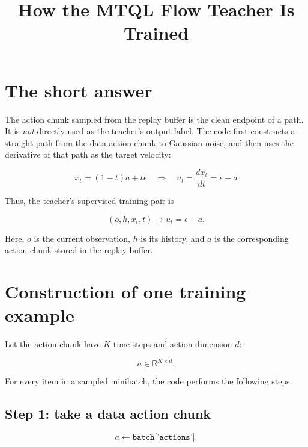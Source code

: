 \documentclass[11pt]{article}
\title{How the MTQL Flow Teacher Is Trained}
\author{}
\date{}
\begin{document}
\maketitle

\section{The short answer}

The action chunk sampled from the replay buffer is the clean endpoint of a path.
It is \emph{not} directly used as the teacher's output label.  The code first
constructs a straight path from the data action chunk to Gaussian noise, and
then uses the derivative of that path as the target velocity:

\begin{equation}
    \boxed{
    x_t=(1-t)a+t\epsilon
    \quad\Longrightarrow\quad
    u_t=\frac{d x_t}{dt}=\epsilon-a
    }
    \label{eq:key}
\end{equation}

Thus, the teacher's supervised training pair is

\begin{equation}
    \boxed{
    (o,h,x_t,t) \longmapsto u_t=\epsilon-a
    }.
\end{equation}

Here, $o$ is the current observation, $h$ is its history, and $a$ is the
corresponding action chunk stored in the replay buffer.

\section{Construction of one training example}

Let the action chunk have $K$ time steps and action dimension $d$:

\begin{equation}
    a\in\mathbb{R}^{K\times d}.
\end{equation}

For every item in a sampled minibatch, the code performs the following steps.

\subsection*{Step 1: take a data action chunk}

\begin{equation}
    a \leftarrow \texttt{batch['actions']}.
\end{equation}
\end{document}

